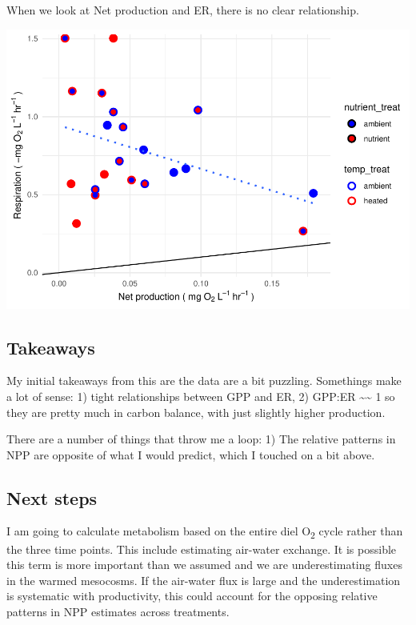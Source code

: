\documentclass[
]{article}
\begin{document}
When we look at Net production and ER, there is no clear relationship.

\includegraphics{GPP-report_files/figure-latex/NPP-ER scatter-1.pdf}

\hypertarget{takeaways}{%
\subsection{Takeaways}\label{takeaways}}

My initial takeaways from this are the data are a bit puzzling.
Somethings make a lot of sense: 1) tight relationships between GPP and
ER, 2) GPP:ER \textasciitilde\textasciitilde{} 1 so they are pretty much
in carbon balance, with just slightly higher production.

There are a number of things that throw me a loop: 1) The relative
patterns in NPP are opposite of what I would predict, which I touched on
a bit above.

\hypertarget{next-steps}{%
\subsection{Next steps}\label{next-steps}}

I am going to calculate metabolism based on the entire diel
O\textsubscript{2} cycle rather than the three time points. This include
estimating air-water exchange. It is possible this term is more
important than we assumed and we are underestimating fluxes in the
warmed mesocosms. If the air-water flux is large and the underestimation
is systematic with productivity, this could account for the opposing
relative patterns in NPP estimates across treatments.
\end{document}
